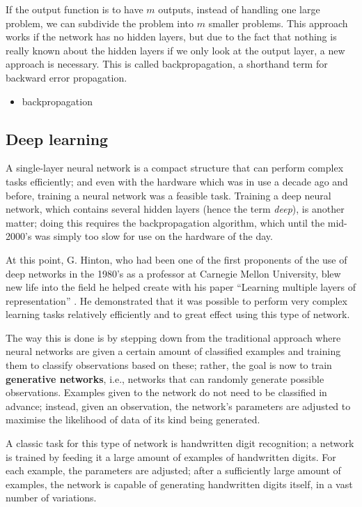 If the output function is to have $m$ outputs, instead of handling one
large problem, we can subdivide the problem into $m$ smaller
problems. This approach works if the network has no hidden layers, but
due to the fact that nothing is really known about the hidden layers
if we only look at the output layer, a new approach is necessary. This
is called backpropagation, a shorthand term for backward error
propagation.
\begin{itemize}
\item backpropagation
\end{itemize}

\subsection{Deep learning}
\label{sec:deeplearning}

A single-layer neural network is a compact structure that can perform
complex tasks efficiently; and even with the hardware which was in use
a decade ago and before, training a neural network was a feasible
task. Training a deep neural network, which contains several hidden
layers (hence the term \textit{deep}), is another matter; doing this
requires the backpropagation algorithm, which until the mid-2000's was
simply too slow for use on the hardware of the day.

At this point, G. Hinton, who had been one of the first proponents of
the use of deep networks in the 1980's as a professor at Carnegie
Mellon University, blew new life into the field he helped create with
his paper ``Learning multiple layers of representation''
\citep{hinton2007learning}. He demonstrated that it was possible to
perform very complex learning tasks relatively efficiently and to
great effect using this type of network.

The way this is done is by stepping down from the traditional approach
where neural networks are given a certain amount of classified
examples and training them to classify observations based on these;
rather, the goal is now to train \textbf{generative networks}, i.e.,
networks that can randomly generate possible observations. Examples
given to the network do not need to be classified in advance; instead,
given an observation, the network's parameters are adjusted to
maximise the likelihood of data of its kind being
generated. 

A classic task for this type of network is handwritten digit
recognition; a network is trained by feeding it a large amount of
examples of handwritten digits. For each example, the parameters are
adjusted; after a sufficiently large amount of examples, the network
is capable of generating handwritten digits itself, in a vast number
of variations.


